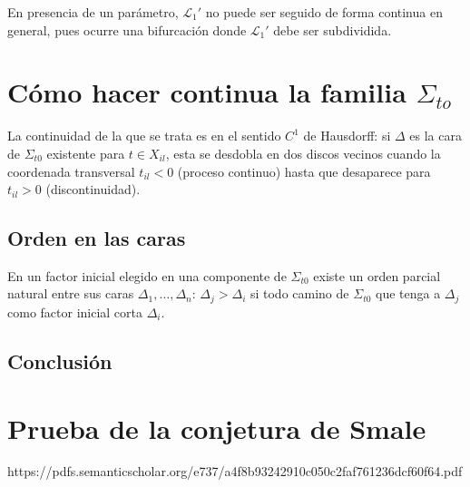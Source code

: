 \documentclass[twoside, 11pt]{article}
\newcommand{\LL}{\mathcal{L}}
\begin{document}
En presencia de un parámetro, $\LL_1'$ no puede ser seguido de forma continua en general, pues ocurre una bifurcación donde $\LL_1'$ debe ser subdividida. 

\section{Cómo hacer continua la familia $\Sigma_{to}$}

La continuidad de la que se trata es en el sentido $C^1$ de Hausdorff: si $\Delta$ es la cara de $\Sigma_{t0}$ existente para $t\in X_{il}$, esta se desdobla en dos discos vecinos cuando la coordenada transversal $t_{il}<0$ (proceso continuo) hasta que desaparece para $t_{il}>0$ (discontinuidad).

\subsection{Orden en las caras}

En un factor inicial elegido en una componente de $\Sigma_{t0}$ existe un orden parcial natural entre sus caras $\Delta_1,\dots, \Delta_n$: $\Delta_j>\Delta_i$ si todo camino de $\Sigma_{t0}$ que tenga a $\Delta_j$ como factor inicial corta $\Delta_i$.

\subsection{Conclusión}


\section{Prueba de la conjetura de Smale}

\begin{thebibliography}{}
 https://pdfs.semanticscholar.org/e737/a4f8b93242910c050c2faf761236dcf60f64.pdf
\end{thebibliography}
\end{document}
